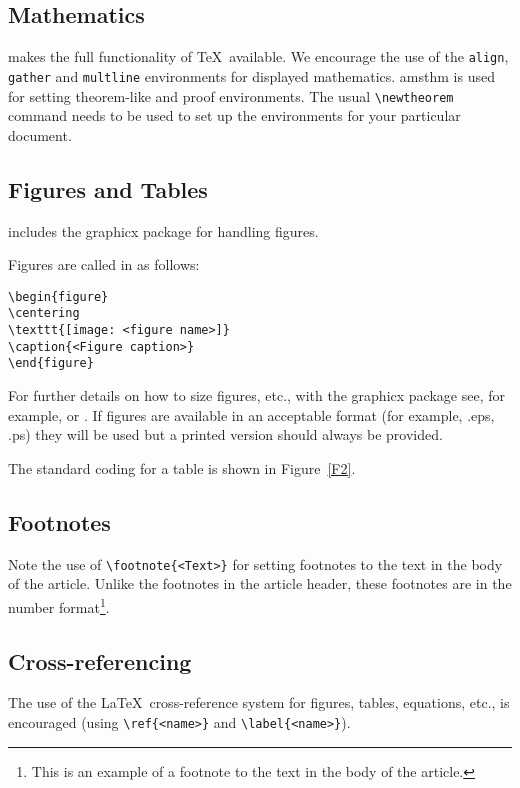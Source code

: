 \documentclass[fonts]{icst}
\begin{document}
\subsection{Mathematics} \textsf{\journalclass} makes the full
functionality of \AmS\/\TeX\ available. We encourage the use of
the \verb"align", \verb"gather" and \verb"multline" environments
for displayed mathematics. \textsf{amsthm} is used for setting
theorem-like and proof environments. The usual \verb"\newtheorem"
command needs to be used to set up the environments for your
particular document.

\subsection{Figures and Tables} \textsf{\journalclass} includes the
\textsf{graphicx} package for handling figures.

Figures are called in as follows:
\begin{verbatim}
\begin{figure}
\centering
\texttt{[image: <figure name>]}
\caption{<Figure caption>}
\end{figure}
\end{verbatim}

For further details on how to size figures, etc., with the
\textsf{graphicx} package see, for example, \cite{R1}
or \cite{R3}. If figures are available in an
acceptable format (for example, .eps, .ps) they will be used but a
printed version should always be provided. \medbreak

The standard coding for a table is shown in Figure~\ref{F2}.

\subsection{Footnotes}
Note the use of \verb"\footnote{<Text>}" for setting footnotes to the text in the body of the article. Unlike the footnotes in the article header, these footnotes are in the number format\footnote{This is an example of a footnote to the text in the body of the article.}. 

\subsection{Cross-referencing}
The use of the \LaTeX\ cross-reference system
for figures, tables, equations, etc., is encouraged
(using \verb"\ref{<name>}" and \verb"\label{<name>}").
\end{document}
